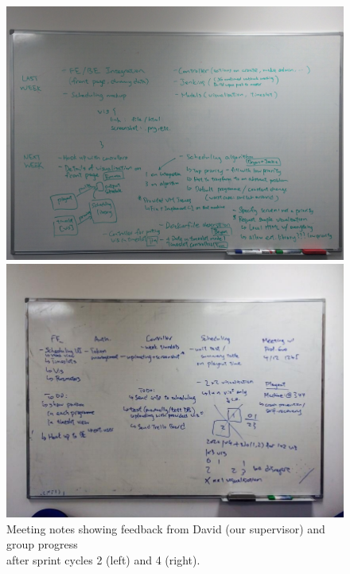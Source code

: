\documentclass[a4paper]{article}
\begin{document}
\begin{figure}[H]
  \begin{minipage}{0.49\textwidth}
    \includegraphics[width = \textwidth, trim = 0 2cm 0 7cm, clip]{./evaluation/meeting-board2.jpg}
  \end{minipage}
  \begin{minipage}{0.49\textwidth}
    \includegraphics[width = \textwidth, trim = 1.2cm 1.5cm 1.2cm 2.5cm, clip]{./evaluation/meeting-board.jpg}
  \end{minipage}
  \caption{Meeting notes showing feedback from David (our supervisor) and group progress \\
                    after sprint cycles 2 (left) and 4 (right).}
  \label{fig:meetingboard}
\end{figure}
\end{document}
